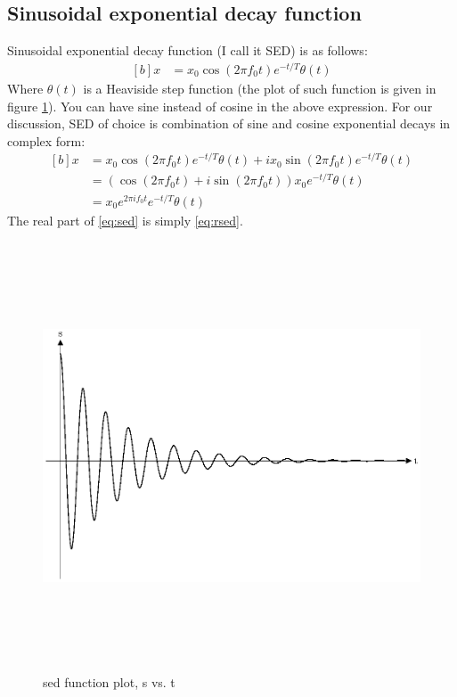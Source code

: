 \documentclass[letterpaper, 11pt]{article}
\newcommand{\sed}[2]{#2_{0}e^{2\pi if_{0}#1}e^{-#1/T} \theta (#1)} %
\numberwithin{equation}{section}
\numberwithin{figure}{section}
\numberwithin{table}{section}
\begin{document}
\subsection{Sinusoidal exponential decay function}
Sinusoidal exponential decay function (I call it SED) is as follows:
\begin{equation}
	\begin{aligned}[b]
		x &= x_{0}\cos{(2\pi f_{0}t)}e^{-t/T} \theta(t)
		\label{eq:rsed}
	\end{aligned}
\end{equation}
Where \(\theta (t)\) is a Heaviside step function (the plot of such function is given in figure \ref{fig1}). You can have sine instead of cosine in the above expression. For our discussion, SED of choice is combination of sine and cosine exponential decays in complex form:
\begin{equation}
	\begin{aligned}[b]
		x	&= x_{0}\cos{(2\pi f_{0}t)}e^{-t/T} \theta(t)+ i x_{0}\sin{(2\pi f_{0}t)}e^{-t/T} \theta(t)\\
			&= (\cos{(2\pi f_{0}t)} +i \sin{(2\pi f_{0}t)})x_{0}e^{-t/T} \theta(t) \\
			&= \sed{t}{x}
			\label{eq:sed}
	\end{aligned}
\end{equation}
The real part of \eqref{eq:sed} is simply \eqref{eq:rsed}.


\begin{figure}[H]
	\centering
	\includegraphics[height=5in]{sed.eps}
	\caption{sed function plot, s vs. t}
	\label{fig1}
\end{figure}
\end{document}

